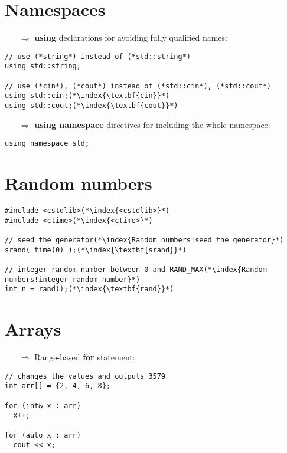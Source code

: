 \documentclass[10pt]{article}
\begin{document}
%
%
\section{Namespaces}
\small
\begin{enumerate}
\item[$\Rightarrow$] \textbf{using} declarations for avoiding fully qualified names:
\end{enumerate}
\begin{lstlisting}
// use (*string*) instead of (*std::string*)
using std::string;

// use (*cin*), (*cout*) instead of (*std::cin*), (*std::cout*)
using std::cin;(*\index{\textbf{cin}}*)
using std::cout;(*\index{\textbf{cout}}*)
\end{lstlisting}
\begin{enumerate}
\item[$\Rightarrow$] \textbf{using namespace} directives for including the whole namespace:
\end{enumerate}
\begin{lstlisting}
using namespace std;
\end{lstlisting}
%
%
\section{Random numbers}
\small
\begin{lstlisting}
#include <cstdlib>(*\index{<cstdlib>}*)
#include <ctime>(*\index{<ctime>}*)

// seed the generator(*\index{Random numbers!seed the generator}*)
srand( time(0) );(*\index{\textbf{srand}}*)

// integer random number between 0 and RAND_MAX(*\index{Random numbers!integer random number}*)
int n = rand();(*\index{\textbf{rand}}*)
\end{lstlisting}
%
%
\section{Arrays}
\small
\begin{enumerate}
\item[$\Rightarrow$] Range-based \textbf{for} statement:
\end{enumerate}
\begin{lstlisting}
// changes the values and outputs 3579
int arr[] = {2, 4, 6, 8};

for (int& x : arr)
  x++;

for (auto x : arr)
  cout << x;
\end{lstlisting}
%
%
\end{document}
